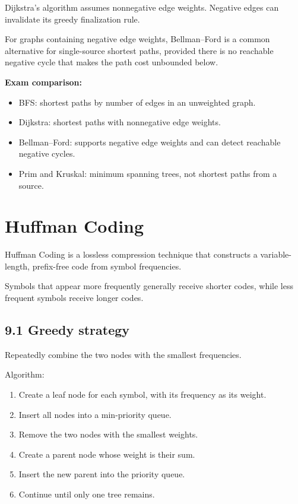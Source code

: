 Dijkstra's algorithm assumes nonnegative edge weights. Negative edges can invalidate its greedy finalization rule.

For graphs containing negative edge weights, Bellman--Ford is a common alternative for single-source shortest paths, provided there is no reachable negative cycle that makes the path cost unbounded below.

\textbf{Exam comparison:}

\begin{itemize}
    \item BFS: shortest paths by number of edges in an unweighted graph.
    \item Dijkstra: shortest paths with nonnegative edge weights.
    \item Bellman--Ford: supports negative edge weights and can detect reachable negative cycles.
    \item Prim and Kruskal: minimum spanning trees, not shortest paths from a source.
\end{itemize}

\section{Huffman Coding}

Huffman Coding is a lossless compression technique that constructs a variable-length, prefix-free code from symbol frequencies.

Symbols that appear more frequently generally receive shorter codes, while less frequent symbols receive longer codes.

\subsection{9.1 Greedy strategy}

Repeatedly combine the two nodes with the smallest frequencies.

Algorithm:

\begin{enumerate}
    \item Create a leaf node for each symbol, with its frequency as its weight.
    \item Insert all nodes into a min-priority queue.
    \item Remove the two nodes with the smallest weights.
    \item Create a parent node whose weight is their sum.
    \item Insert the new parent into the priority queue.
    \item Continue until only one tree remains.
\end{enumerate}

